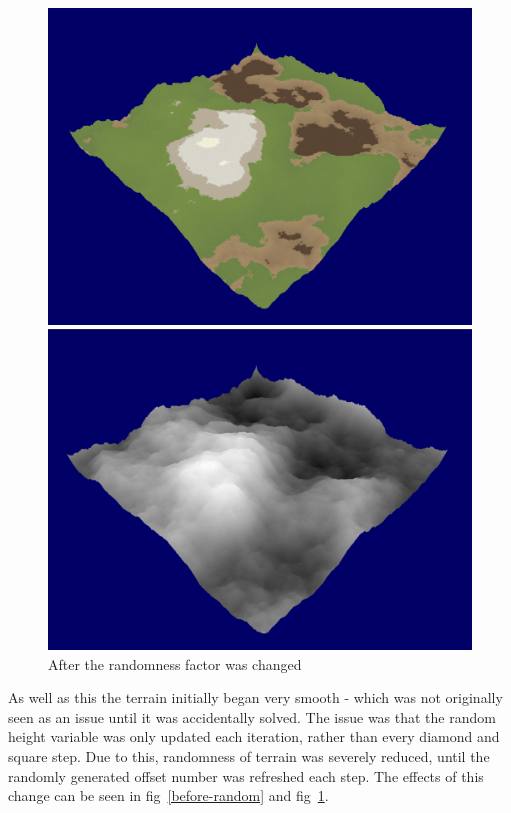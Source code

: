 \documentclass[a4paper,10pt]{report}
\begin{document}
\begin{figure}[h!]
\centering
\begin{minipage}{.4\textwidth}
  \centering
  \includegraphics[width=.9\linewidth]{Images/Sprint-Images/Sprint-7-After-Colour.png}
\end{minipage}
\begin{minipage}{.4\textwidth}
  \centering
  \includegraphics[width=.9\linewidth]{Images/Sprint-Images/Sprint-7-After-Greyscale.png}
\end{minipage}
\caption{After the randomness factor was changed}
\label{after-random}
\end{figure}


As well as this the terrain initially began very smooth - which was not originally seen as an issue until it was accidentally solved. The issue was that the random height variable was only updated each iteration, rather than every diamond and square step. Due to this, randomness of terrain was severely reduced, until the randomly generated offset number was refreshed each step. The effects of this change can be seen in fig~\ref{before-random} and fig~\ref{after-random}.
\end{document}
